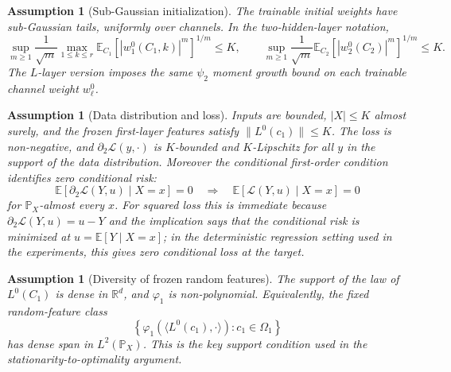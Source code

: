 \documentclass{article}
\newtheorem{assumption}[theorem]{Assumption}
\newcommand{\R}{\mathbb{R}}
\newcommand{\E}{\mathbb{E}}
\newcommand{\Pp}{\mathbb{P}}
\newcommand{\calL}{\mathcal{L}}
\begin{document}
\begin{assumption}[Sub-Gaussian initialization]
\label{assump:init}
The trainable initial weights have sub-Gaussian tails, uniformly over channels. In the two-hidden-layer notation,
\begin{equation}
\sup_{m\ge1}\frac{1}{\sqrt m}
\max_{1\le k\le r}
\E_{C_1}\!\left[|w_1^0(C_1,k)|^m\right]^{1/m}\le K,
\qquad
\sup_{m\ge1}\frac{1}{\sqrt m}
\E_{C_2}\!\left[|w_2^0(C_2)|^m\right]^{1/m}\le K.
\end{equation}
The $L$-layer version imposes the same $\psi_2$ moment growth bound on each trainable channel weight $w_\ell^0$.
\end{assumption}

\begin{assumption}[Data distribution and loss]
\label{assump:data}
\label{assump:loss}
Inputs are bounded, $|X|\le K$ almost surely, and the frozen first-layer features satisfy $\|L^0(c_1)\|\le K$. The loss is non-negative, and $\partial_2\calL(y,\cdot)$ is $K$-bounded and $K$-Lipschitz for all $y$ in the support of the data distribution. Moreover the conditional first-order condition identifies zero conditional risk:
\begin{equation}
\E[\partial_2\calL(Y,u)\mid X=x]=0
\quad\Longrightarrow\quad
\E[\calL(Y,u)\mid X=x]=0
\label{eq:loss-identifiability}
\end{equation}
for $\Pp_X$-almost every $x$. For squared loss this is immediate because $\partial_2\calL(Y,u)=u-Y$ and the implication says that the conditional risk is minimized at $u=\E[Y\mid X=x]$; in the deterministic regression setting used in the experiments, this gives zero conditional loss at the target.
\end{assumption}

\begin{assumption}[Diversity of frozen random features]
\label{assump:diversity}
The support of the law of $L^0(C_1)$ is dense in $\R^d$, and $\varphi_1$ is non-polynomial. Equivalently, the fixed random-feature class
\begin{equation}
\left\{
\varphi_1\!\left(\langle L^0(c_1),\cdot\rangle\right):c_1\in\Omega_1
\right\}
\end{equation}
has dense span in $L^2(\Pp_X)$. This is the key support condition used in the stationarity-to-optimality argument.
\end{assumption}
\end{document}
